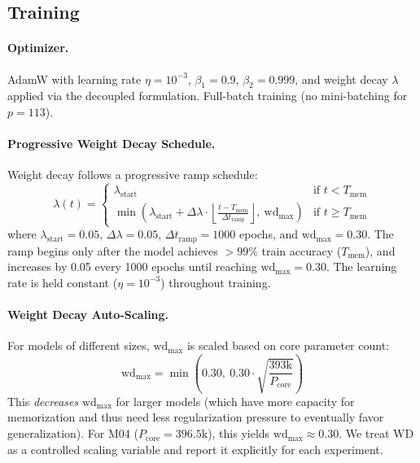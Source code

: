 \documentclass[twoside,11pt]{article}
\newcommand{\Tmem}{T_{\mathrm{mem}}}
\newcommand{\wdmax}{\mathrm{wd}_{\max}}
\newcommand{\Pcore}{P_{\mathrm{core}}}
\begin{document}
\subsection{Training}

\paragraph{Optimizer.} AdamW \citep{loshchilov2019decoupled} with learning rate $\eta = 10^{-3}$, $\beta_1 = 0.9$, $\beta_2 = 0.999$, and weight decay $\lambda$ applied via the decoupled formulation. Full-batch training (no mini-batching for $p = 113$).

\paragraph{Progressive Weight Decay Schedule.} Weight decay follows a progressive ramp schedule:
\begin{equation}
    \lambda(t) = \begin{cases}
        \lambda_{\mathrm{start}} & \text{if } t < \Tmem \\
        \min\!\left(\lambda_{\mathrm{start}} + \Delta\lambda \cdot \left\lfloor\frac{t - \Tmem}{\Delta t_{\mathrm{ramp}}}\right\rfloor,\ \wdmax\right) & \text{if } t \geq \Tmem
    \end{cases}
    \label{eq:wd_schedule}
\end{equation}
where $\lambda_{\mathrm{start}} = 0.05$, $\Delta\lambda = 0.05$, $\Delta t_{\mathrm{ramp}} = 1000$ epochs, and $\wdmax = 0.30$. The ramp begins only after the model achieves $>99\%$ train accuracy ($\Tmem$), and increases by 0.05 every 1000 epochs until reaching $\wdmax = 0.30$. The learning rate is held constant ($\eta = 10^{-3}$) throughout training.

\paragraph{Weight Decay Auto-Scaling.} For models of different sizes, $\wdmax$ is scaled based on core parameter count:
\begin{equation}
    \wdmax = \min\!\left(0.30,\ 0.30 \cdot \sqrt{\frac{393\text{k}}{\Pcore}}\right)
    \label{eq:wd_auto}
\end{equation}
This \emph{decreases} $\wdmax$ for larger models (which have more capacity for memorization and thus need less regularization pressure to eventually favor generalization). For M04 ($\Pcore = 396.5\text{k}$), this yields $\wdmax \approx 0.30$. We treat WD as a controlled scaling variable and report it explicitly for each experiment.
\end{document}
